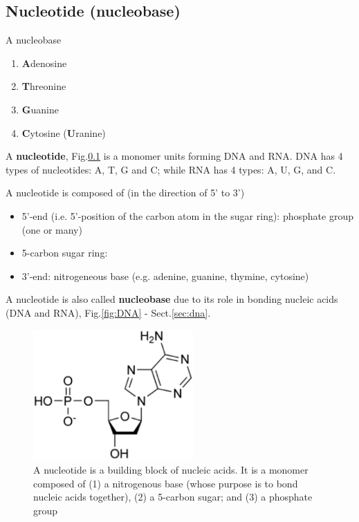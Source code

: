 \subsection{Nucleotide (nucleobase)}
\label{sec:nucleotide}

A nucleobase
\begin{enumerate}
  \item {\bf A}denosine	
  \item {\bf T}hreonine
  \item {\bf G}uanine	
  \item {\bf C}ytosine ({\bf U}ranine)
\end{enumerate}

A {\bf nucleotide}, Fig.\ref{sec:nucleotide} is a monomer units forming DNA and
RNA. DNA has 4 types of nucleotides: A, T, G and C; while RNA has 4 types: A, U,
G, and C.

A nucleotide is composed of (in the direction of 5' to 3')
\begin{itemize}
  \item 5'-end (i.e. 5'-position of the carbon atom in the sugar ring):
  phosphate group (one or many)

  \item 5-carbon sugar ring:

  \item 3'-end:  nitrogeneous base (e.g.  adenine, guanine, thymine, cytosine)
\end{itemize}
A nucleotide is also called {\bf nucleobase} due to its role in bonding nucleic
acids (DNA and RNA), Fig.\ref{fig:DNA} - Sect.\ref{sec:dna}.

\begin{figure}[hbt]
  \centerline{\includegraphics[height=5cm,
    angle=0]{./images/nucleotide.eps}}
\caption{A nucleotide is a building block of nucleic acids. It is a monomer
composed of (1) a nitrogenous base (whose purpose is to bond nucleic acids
together), (2) a 5-carbon sugar; and (3) a phosphate group }
\label{fig:nucleotide}
\end{figure}


